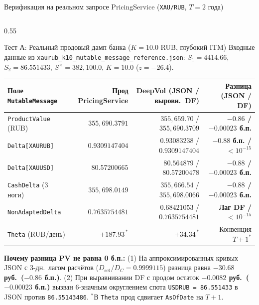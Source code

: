 \documentclass[aspectratio=169, 9pt]{beamer}
\begin{document}
\begin{frame}{Верификация на реальном запросе PricingService (\texttt{XAU/RUB}, $T = 2$ года)}
  \begin{columns}[T]
    \begin{column}{0.55\textwidth}
      \begin{block}{Тест А: Реальный продовый дамп банка ($K = 10.0$ RUB, глубокий ITM)}
        Входные данные из \texttt{xaurub\_k10\_mutable\_message\_reference.json}:
        $S_1 = 4414.66$, $S_2 = 86.551433$, $S^\times = 382,100.0$, $K = 10.0$ ($z = -26.4$).
        \vspace{0.2em}

        \tiny
        \renewcommand{\arraystretch}{1.18}
        \begin{tabular}{@{}lrrr@{}}
          \toprule
          \textbf{Поле \texttt{MutableMessage}} & \textbf{Прод PricingService} & \textbf{DeepVol (JSON / выровн.\ DF)} & \textbf{Разница (JSON / DF)} \\
          \midrule
          \texttt{ProductValue} (RUB) & $355,690.3791$ & $355,659.70$ / $355,690.3709$ & \textbf{\color{sberemerald}$-0.86$ / $-0.00023$ б.п.} \\
          \texttt{Delta[XAURUB]} & $0.9309147404$ & $0.93083238$ / $0.9309147404$ & \textbf{\color{sberemerald}$-0.88$ б.п. / $<10^{-15}$} \\
          \texttt{Delta[XAUUSD]} & $80.57200665$ & $80.564879$ / $80.57200478$ & \textbf{\color{sberemerald}$-0.88$ / $-0.00023$ б.п.} \\
          \texttt{CashDelta} (3 ноги) & $355,698.0149$ & $355,666.54$ / $355,698.0066$ & \textbf{\color{sberemerald}$-0.88$ / $-0.00023$ б.п.} \\
          \texttt{NonAdaptedDelta} & $0.7635754481$ & $0.68421053$ / $0.7635754481$ & \textbf{\color{sberemerald}Лаг DF / $<10^{-15}$} \\
          \texttt{Theta} (RUB/день) & $+187.93^{\,*}$ & $+34.34^{\,*}$ & Конвенция $T+1^*$ \\
          \bottomrule
        \end{tabular}
        \vspace{0.15em}

        {\tiny \textbf{Почему разница PV не равна 0 б.п.:} (1) На аппроксимированных кривых JSON с 3-дн.\ лагом расчётов ($D_{\text{set}}/D_C = 0.9999115$) разница равна \textbf{$-30.68$ руб.\ ($-0.86$ б.п.)}. (2) При выравнивании DF с продом остаток \textbf{$-0.0082$ руб.\ ($-0.00023$ б.п.)} вызван 6-значным округлением спота \texttt{USDRUB = 86.551433} в JSON против \texttt{86.55143486}. $^*$В \texttt{Theta} прод сдвигает \texttt{AsOfDate} на $T+1$.}
      \end{block}
    \end{column}


\end{columns}
\end{frame}
\end{document}
